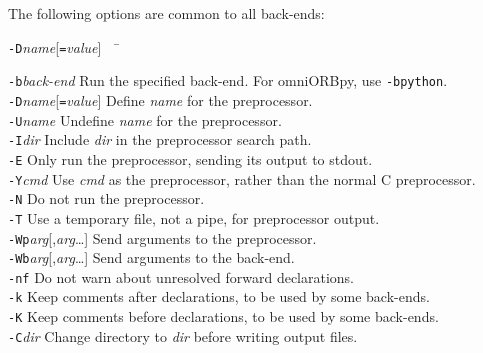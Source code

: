\documentclass[11pt,oneside,a4paper]{book}
\newcommand{\cmdline}[1]{\texttt{#1}}
\begin{document}
The following options are common to all back-ends:

\begin{tabbing}
\cmdline{-D}\textit{name}[\cmdline{=}\textit{value}]~~ \= \kill

\cmdline{-b}\textit{back-end}
     \> Run the specified back-end. For omniORBpy, use \cmdline{-bpython}.\\

\cmdline{-D}\textit{name}[\cmdline{=}\textit{value}]
     \> Define \textit{name} for the preprocessor.\\

\cmdline{-U}\textit{name}
     \> Undefine \textit{name} for the preprocessor.\\

\cmdline{-I}\textit{dir}
     \> Include \textit{dir} in the preprocessor search path.\\

\cmdline{-E}
     \> Only run the preprocessor, sending its output to stdout.\\

\cmdline{-Y}\textit{cmd}
     \> Use \textit{cmd} as the preprocessor, rather than the normal C
        preprocessor.\\

\cmdline{-N}
     \> Do not run the preprocessor.\\

\cmdline{-T}
     \> Use a temporary file, not a pipe, for preprocessor output.\\

\cmdline{-Wp}\textit{arg}[,\textit{arg}\dots]
     \> Send arguments to the preprocessor.\\

\cmdline{-Wb}\textit{arg}[,\textit{arg}\dots]
     \> Send arguments to the back-end.\\

\cmdline{-nf}
     \> Do not warn about unresolved forward declarations.\\

\cmdline{-k}
     \> Keep comments after declarations, to be used by some back-ends.\\

\cmdline{-K}
     \> Keep comments before declarations, to be used by some back-ends.\\

\cmdline{-C}\textit{dir}
     \> Change directory to \textit{dir} before writing output files.\\


\end{tabbing}
\end{document}
